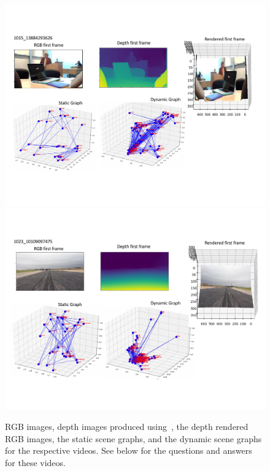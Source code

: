 \documentclass[letterpaper]{article}
\begin{document}
\begin{figure}
    \centering
    \includegraphics[width=16cm,trim={0cm 3cm 0cm 3.0cm},clip]{./figs/sg_quals_3.pdf}
     \includegraphics[width=16cm,trim={0cm 3cm 0cm 3.0cm},clip]{./figs/sg_quals_4.pdf}
    \caption{RGB images, depth images produced using~\cite{ranftl2019towards}, the depth rendered RGB images, the static scene graphs, and the dynamic scene graphs for the respective videos. See below for the questions and answers for these videos.}
    \label{fig:quals_2}
\end{figure}
\end{document}
